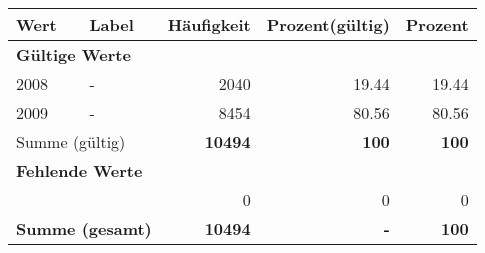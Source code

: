      \begin{longtable}{lXrrr}
     \toprule
     \textbf{Wert} & \textbf{Label} & \textbf{Häufigkeit} & \textbf{Prozent(gültig)} & \textbf{Prozent} \\
     \endhead
     \midrule
     \multicolumn{5}{l}{\textbf{Gültige Werte}}\\

     2008 &
     \multicolumn{1}{X}{ -  } &


       \num{2040} &
       \num[round-mode=places,round-precision=2]{19,44} &
         \num[round-mode=places,round-precision=2]{19,44} \\

     2009 &
     \multicolumn{1}{X}{ -  } &


       \num{8454} &
       \num[round-mode=places,round-precision=2]{80,56} &
         \num[round-mode=places,round-precision=2]{80,56} \\
     \midrule
     \multicolumn{2}{l}{Summe (gültig)} &
       \textbf{\num{10494}} &
     \textbf{100} &
       \textbf{\num[round-mode=places,round-precision=2]{100}} \\
     \multicolumn{5}{l}{\textbf{Fehlende Werte}}\\
      & & 0 & 0 & 0 \\
     \midrule
     \multicolumn{2}{l}{\textbf{Summe (gesamt)}} &
          \textbf{\num{10494}} &
        \textbf{-} &
        \textbf{100} \\
     \bottomrule
     \end{longtable}
     
